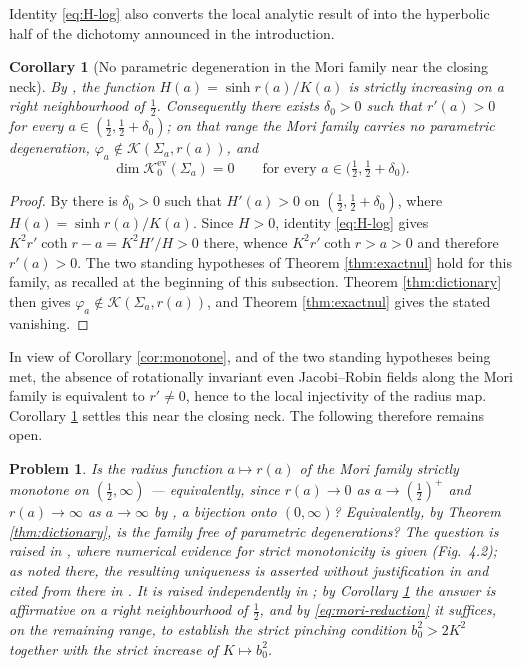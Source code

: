 \documentclass[10pt,a4paper]{amsart}
\newtheorem{corollary}[theorem]{Corollary}
\newtheorem{problem}[theorem]{Problem}
\newcommand{\Ker}{\mathcal{K}}
\begin{document}
Identity \eqref{eq:H-log} also converts the local analytic result of \cite{P1} into the hyperbolic half of the dichotomy announced in the introduction.

\begin{corollary}[No parametric degeneration in the Mori family near the closing neck]\label{cor:mori-local}
By \cite[Cor. 11.10]{P1}, the function $H(a)=\sinh r(a)/K(a)$ is strictly increasing on a right neighbourhood of $\tfrac12$. Consequently there exists $\delta_0>0$ such that $r'(a)>0$ for every $a\in(\tfrac12,\tfrac12+\delta_0)$; on that range the Mori family carries no parametric degeneration, $\varphi_a\notin\Ker(\Sigma_a,r(a))$, and
\[
\dim\Ker_0^{\mathrm{ev}}(\Sigma_a)=0\qquad\text{for every }a\in\bigl(\tfrac12,\tfrac12+\delta_0\bigr).
\]
\end{corollary}

\begin{proof}
By \cite[Cor. 11.10]{P1} there is $\delta_0>0$ such that $H'(a)>0$ on $(\tfrac12,\tfrac12+\delta_0)$, where $H(a)=\sinh r(a)/K(a)$. Since $H>0$, identity \eqref{eq:H-log} gives $K^2r'\coth r-a=K^2H'/H>0$ there, whence $K^2r'\coth r>a>0$ and therefore $r'(a)>0$. The two standing hypotheses of Theorem \ref{thm:exactnul} hold for this family, as recalled at the beginning of this subsection. Theorem \ref{thm:dictionary} then gives $\varphi_a\notin\Ker(\Sigma_a,r(a))$, and Theorem \ref{thm:exactnul} gives the stated vanishing.
\end{proof}

In view of Corollary \ref{cor:monotone}, and of the two standing hypotheses being met, the absence of rotationally invariant even Jacobi--Robin fields along the Mori family is equivalent to $r'\neq 0$, hence to the local injectivity of the radius map. Corollary \ref{cor:mori-local} settles this near the closing neck. The following therefore remains open.

\begin{problem}\label{prob:mori}
Is the radius function $a\mapsto r(a)$ of the Mori family strictly monotone on $(\tfrac12,\infty)$ --- equivalently, since $r(a)\to 0$ as $a\to(\tfrac12)^+$ and $r(a)\to\infty$ as $a\to\infty$ by \cite{P2}, a bijection onto $(0,\infty)$? Equivalently, by Theorem \ref{thm:dictionary}, is the family free of parametric degenerations? The question is raised in \cite[Rem.~4.3]{dO-thesis}, where numerical evidence for strict monotonicity is given (Fig.~4.2); as noted there, the resulting uniqueness is asserted without justification in \cite{LX18} and cited from there in \cite{Med23}. It is raised independently in \cite[Question 6.3]{P2}; by Corollary \ref{cor:mori-local} the answer is affirmative on a right neighbourhood of $\tfrac12$, and by \eqref{eq:mori-reduction} it suffices, on the remaining range, to establish the strict pinching condition $b_0^2>2K^2$ together with the strict increase of $K\mapsto b_0^2$.
\end{problem}
\end{document}
